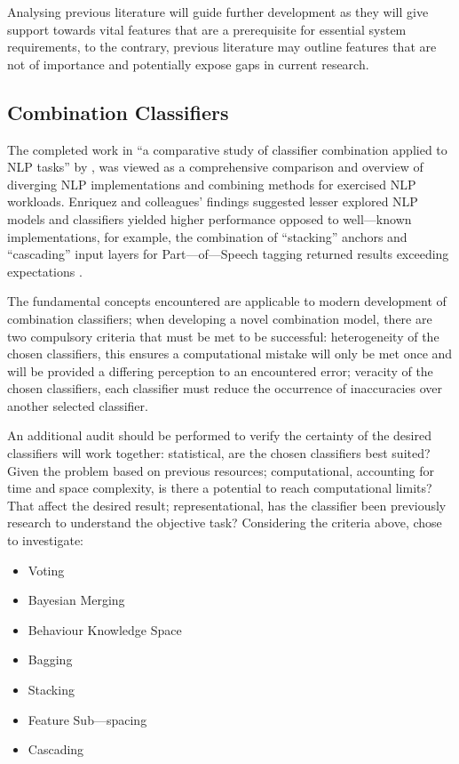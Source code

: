 Analysing previous literature will guide further development as they will give support towards vital features that are a prerequisite for essential system requirements, to the contrary, previous literature may outline features that are not of importance and potentially expose gaps in current research.

\subsection{Combination Classifiers}

The completed work in “a comparative study of classifier combination applied to NLP tasks” by \textcite{enriquez2013comparative}, was viewed as a comprehensive comparison and overview of diverging NLP implementations and combining methods for exercised NLP workloads. Enriquez and colleagues’ findings suggested lesser explored NLP models and classifiers yielded higher performance opposed to well---known implementations, for example, the combination of “stacking” anchors and “cascading” input layers for Part---of---Speech tagging returned results exceeding expectations \parencite{enriquez2013comparative}.

The fundamental concepts \textcite{enriquez2013comparative} encountered are applicable to modern development of combination classifiers; when developing a novel combination model, there are two compulsory criteria that must be met to be successful: heterogeneity of the chosen classifiers, this ensures a computational mistake will only be met once and will be provided a differing perception to an encountered error; veracity of the chosen classifiers, each classifier must reduce the occurrence of inaccuracies over another selected classifier.

An additional audit should be performed to verify the certainty of the desired classifiers will work together: statistical, are the chosen classifiers best suited? Given the problem based on previous resources; computational, accounting for time and space complexity, is there a potential to reach computational limits? That affect the desired result; representational, has the classifier been previously research to understand the objective task? Considering the criteria above, \textcite{enriquez2013comparative} chose to investigate:

\begin{itemize}
    \item Voting
    \item Bayesian Merging
    \item Behaviour Knowledge Space
    \item Bagging
    \item Stacking
    \item Feature Sub---spacing
    \item Cascading
\end{itemize}

